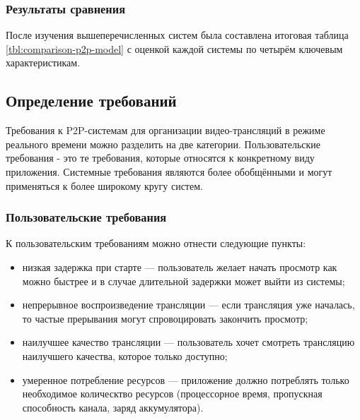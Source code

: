 		\subsubsection{Результаты сравнения}
		После изучения вышеперечисленных систем была составлена итоговая таблица \ref{tbl:comparison-p2p-model} с
		оценкой каждой системы по четырём ключевым характеристикам.

		

	\subsection{Определение требований}
	Требования к P2P-системам для организации видео-трансляций в режиме реального времени можно разделить на две
	категории. Пользовательские требования - это те требования, которые относятся к конкретному виду приложения.
	Системные требования являются более обобщёнными и могут применяться к более широкому кругу систем.

		\subsubsection{Пользовательские требования}
		К пользовательским требованиям можно отнести следующие пункты:
		\begin{itemize}
			\item низкая задержка при старте --- пользователь желает начать просмотр как можно быстрее и в случае
			длительной задержки может выйти из системы;
			\item непрерывное воспроизведение трансляции --- если трансляция уже началась, то частые прерывания могут
			спровоцировать закончить просмотр;
			\item наилучшее качество трансляции --- пользователь хочет смотреть трансляцию наилучшего качества, которое
			только доступно;
			\item умеренное потребление ресурсов --- приложение должно потреблять только необходимое колическтво
			ресурсов (процессорное время, пропускная способность канала, заряд аккумулятора).
		\end{itemize}

